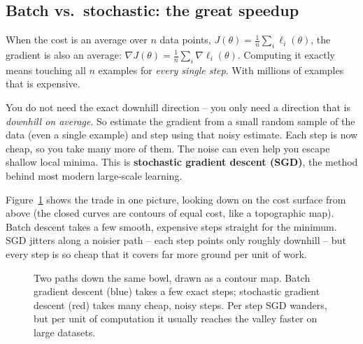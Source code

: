 \subsection{Batch vs.\ stochastic: the great speedup}

When the cost is an average over $n$ data points,
$J(\theta) = \frac1n\sum_i \ell_i(\theta)$, the gradient is also an average:
$\nabla J(\theta) = \frac1n\sum_i \nabla \ell_i(\theta)$. Computing it exactly
means touching all $n$ examples for \emph{every single step}. With millions of
examples that is expensive.

\begin{intuitionbox}
You do not need the exact downhill direction -- you only need a direction that is
\emph{downhill on average}. So estimate the gradient from a small random sample
of the data (even a single example) and step using that noisy estimate. Each
step is now cheap, so you take many more of them. The noise can even help you
escape shallow local minima. This is \textbf{stochastic gradient descent (SGD)},
the method behind most modern large-scale learning.
\end{intuitionbox}

Figure~\ref{ch36:fig-sgd} shows the trade in one picture, looking down on the cost
surface from above (the closed curves are contours of equal cost, like a
topographic map). Batch descent takes a few smooth, expensive steps straight for
the minimum. SGD jitters along a noisier path -- each step points only roughly
downhill -- but every step is so cheap that it covers far more ground per unit of
work.

\begin{figure}[H]
\centering
{}
\caption{Two paths down the same bowl, drawn as a contour map. Batch gradient
descent (blue) takes a few exact steps; stochastic gradient descent (red) takes
many cheap, noisy steps. Per step SGD wanders, but per unit of computation it
usually reaches the valley faster on large datasets.}
\label{ch36:fig-sgd}
\end{figure}

